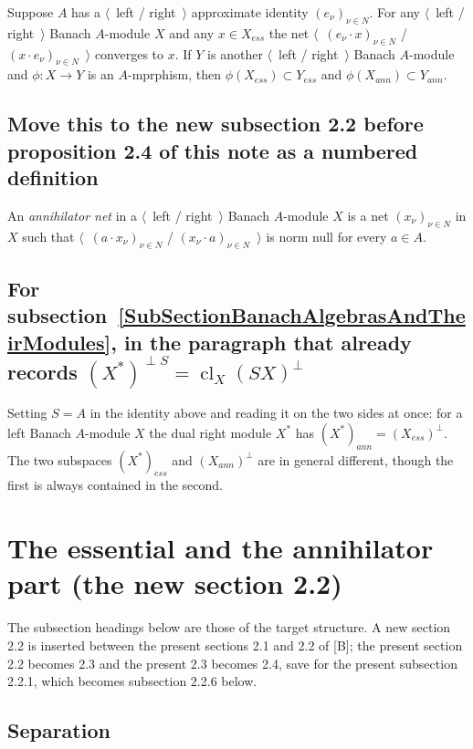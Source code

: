 \documentclass[11pt]{article}
\theoremstyle{plain}
\theoremstyle{definition}
\begin{document}
Suppose $A$ has a $\langle$~left / right~$\rangle$ approximate identity 
${(e_\nu)}_{\nu\in N}$. For any $\langle$~left / right~$\rangle$ Banach $A$-module 
$X$ and any $x\in X_{ess}$ the net $\langle$~${(e_\nu \cdot x)}_{\nu\in N}$ / 
${(x\cdot e_\nu)}_{\nu\in N}$~$\rangle$ converges to $x$. If $Y$ is another 
$\langle$~left / right~$\rangle$ Banach $A$-module and $\phi:X\to Y$ is an 
$A$-mprphism, then $\phi(X_{ess})\subset Y_{ess}$ 
and $\phi(X_{ann})\subset Y_{ann}$. 

\subsection{Move this to the new subsection 2.2 before proposition 2.4 of this 
note as a numbered definition}

An \emph{annihilator net} in a $\langle$~left / right~$\rangle$ Banach
$A$-module $X$ is a net ${(x_\nu)}_{\nu\in N}$ in $X$ such that
$\langle$~${(a\cdot x_\nu)}_{\nu\in N}$ / ${(x_\nu\cdot a)}_{\nu\in N}$~$\rangle$ 
is norm null for every $a\in A$.

\subsection{For subsection~\ref{SubSectionBanachAlgebrasAndTheirModules}, in the
paragraph that already records
${(X^*)}^{\perp S}={\operatorname{cl}_X(S X)}^\perp$}

Setting $S=A$ in the identity above and reading it on the two sides at once: for
a left Banach $A$-module $X$ the dual right module $X^*$ has
${(X^*)}_{ann}={(X_{ess})}^\perp$. The two subspaces ${(X^*)}_{ess}$ 
and ${(X_{ann})}^\perp$ are in general different, though the first is always 
contained in the second.

\section{The essential and the annihilator part (the new section 2.2)}\label{PartII}

The subsection headings below are those of the target structure. A new section
2.2 is inserted between the present sections 2.1 and 2.2 of [B]; the present
section 2.2 becomes 2.3 and the present 2.3 becomes 2.4, save for the present
subsection 2.2.1, which becomes subsection 2.2.6 below.

\subsection{Separation}\label{SubSectionSeparation}
\end{document}
